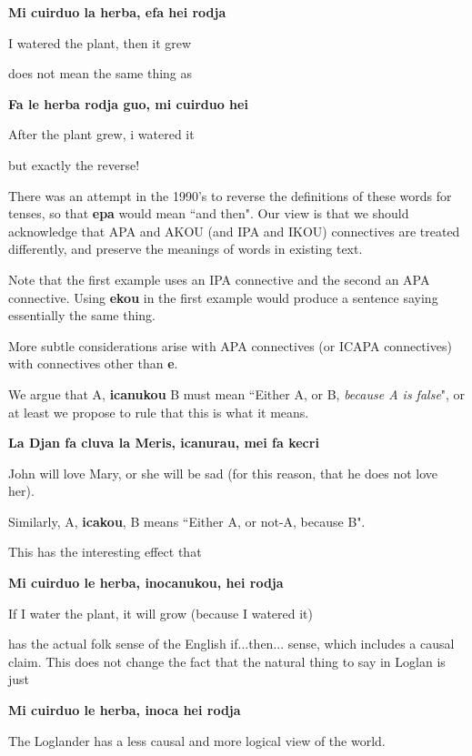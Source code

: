 \documentclass[12pt]{book}
\begin{document}
{{\bf Mi cuirduo la herba, efa hei rodja}

I watered the plant, then it grew

does not mean the same thing as

{\bf Fa le herba rodja guo, mi cuirduo hei}

After the plant grew, i watered it

but exactly the reverse!

There was an attempt in the 1990's to reverse the definitions of these words for tenses, so that {\bf epa} would mean ``and then".  Our view is that we should acknowledge that APA and AKOU (and IPA and IKOU) connectives are treated differently, and preserve the meanings of words in existing text.

Note that the first example uses an IPA connective and the second an APA connective.  Using {\bf ekou} in the first example would produce a sentence
saying essentially the same thing.  

More subtle considerations arise with APA connectives (or ICAPA connectives) with connectives other than {\bf e}.

We argue that A, {\bf icanukou} B must mean ``Either A, or B, {\em because A is false}", or at least we propose to rule that this is what it means.

{\bf La Djan fa cluva la Meris, icanurau, mei fa kecri}

John will love Mary, or she will be sad (for this reason, that he does not love her).

Similarly, A, {\bf icakou}, B means ``Either A,  or not-A, because B".

This has the interesting effect that

{\bf Mi cuirduo le herba, inocanukou, hei rodja}

If I water the plant, it will grow (because I watered it)

has the actual folk sense of the English if...then... sense, which includes a causal claim.  This does not change the fact that the natural thing to say
in Loglan is just

{\bf Mi cuirduo le herba, inoca hei rodja}

The Loglander has a less causal and more logical view of the world.

}
\end{document}
